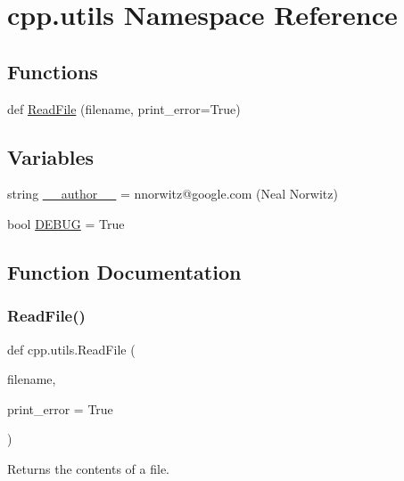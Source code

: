 \hypertarget{namespacecpp_1_1utils}{}\section{cpp.\+utils Namespace Reference}
\label{namespacecpp_1_1utils}
\subsection*{Functions}
\begin{DoxyCompactItemize}
\item 
def \mbox{\hyperlink{namespacecpp_1_1utils_a4258aa53673d101d6f57320ec9a3c3a2}{Read\+File}} (filename, print\+\_\+error=True)
\end{DoxyCompactItemize}
\subsection*{Variables}
\begin{DoxyCompactItemize}
\item 
string \mbox{\hyperlink{namespacecpp_1_1utils_a4881c422e2e8cfc2e4f716b6f7bb0b58}{\+\_\+\+\_\+author\+\_\+\+\_\+}} = \textquotesingle{}nnorwitz@google.\+com (Neal Norwitz)\textquotesingle{}
\item 
bool \mbox{\hyperlink{namespacecpp_1_1utils_aa59cfd61e9b0495b717753e45fe9d201}{D\+E\+B\+UG}} = True
\end{DoxyCompactItemize}


\subsection{Function Documentation}
\mbox{\label{namespacecpp_1_1utils_a4258aa53673d101d6f57320ec9a3c3a2}} 
\subsubsection{\texorpdfstring{ReadFile()}{ReadFile()}}
{\footnotesize\ttfamily def cpp.\+utils.\+Read\+File (\begin{DoxyParamCaption}\item[{}]{filename,  }\item[{}]{print\+\_\+error = {\ttfamily True} }\end{DoxyParamCaption})}

\begin{DoxyVerb}Returns the contents of a file.\end{DoxyVerb}
 

